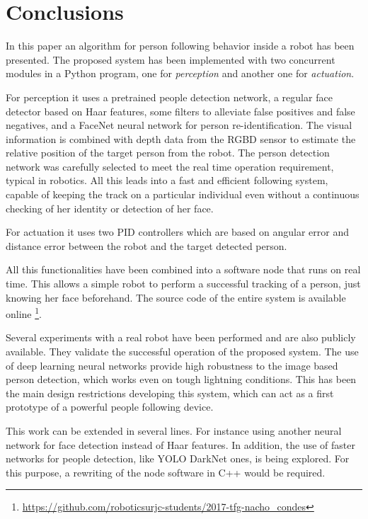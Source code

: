 \section{Conclusions}

In this paper an algorithm for person following behavior inside a robot has been presented. 
The proposed system has been implemented with two concurrent modules in a Python program, one for \emph{perception} and another one for \emph{actuation}. 

For perception it uses a pretrained people detection network, a regular face detector based on Haar features, some filters to alleviate false positives and false negatives, and a FaceNet neural network for person re-identification. The visual information is combined with depth data from the RGBD sensor to estimate the relative position of the target person from the robot. The person detection network was carefully selected to meet the real time operation requirement, typical in robotics. All this leads into a fast and efficient following system, capable of keeping the track on a particular individual even without a continuous checking of her identity or detection of her face. 

For actuation it uses two PID controllers which are based on angular error and distance error between the robot and the target detected person.

All this functionalities have been combined into a software node that runs on real time. This allows a simple robot to perform a successful tracking of a person, just knowing her face beforehand. The source code of the entire system is available online \footnote{\url{https://github.com/roboticsurjc-students/2017-tfg-nacho_condes}}.

Several experiments with a real robot have been performed and are also publicly available. They validate the successful operation of the proposed system. The use of deep learning neural networks provide high robustness to the image based person detection, which works even on tough lightning conditions. This has been the main design restrictions developing this system, which can act as a first prototype of a powerful people following device.


This work can be extended in several lines. For instance using another neural network for face detection instead of Haar features. In addition, the use of faster networks for people detection, like YOLO DarkNet ones, is being explored. For this purpose, a rewriting of the node software in C++ would be required.